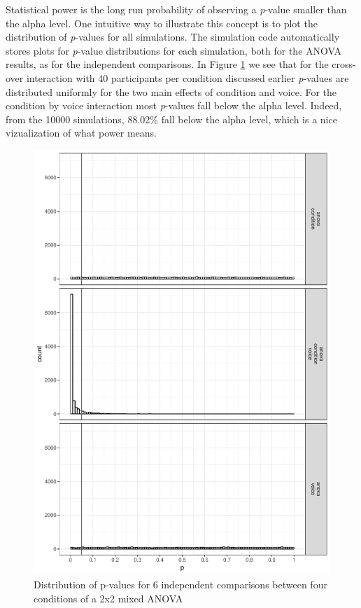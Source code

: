 \documentclass[,jou, draftfirst, a4paper,floatsintext]{apa6}
\begin{document}
Statistical power is the long run probability of observing a \emph{p}-value smaller than the alpha level.
One intuitive way to illustrate this concept is to plot the distribution of \emph{p}-values for all simulations.
The simulation code automatically stores plots for \emph{p}-value distributions for each simulation, both for the ANOVA results, as for the independent comparisons.
In Figure \ref{fig:p-plot} we see that for the cross-over interaction with 40 participants per condition discussed earlier \emph{p}-values are distributed uniformly for the two main effects of condition and voice.
For the condition by voice interaction most \emph{p}-values fall below the alpha level.
Indeed, from the 10000 simulations, 88.02\% fall below the alpha level, which is a nice vizualization of what power means.

\begin{figure}
\centering
\includegraphics{0.1_Simulation_Based_Power_Analysis_For_Factorial_ANOVA_Designs_files/figure-latex/p-plot-1.pdf}
\caption{\label{fig:p-plot}Distribution of p-values for 6 independent comparisons between four conditions of a 2x2 mixed ANOVA}
\end{figure}
\end{document}
